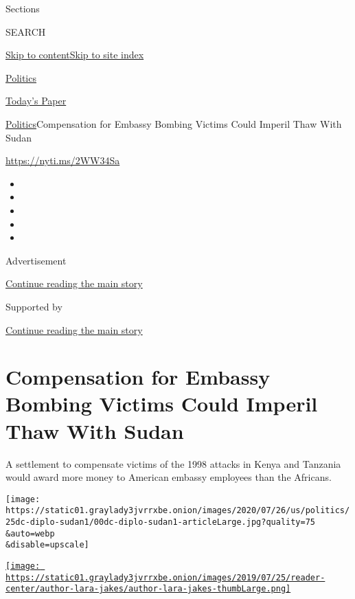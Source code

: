 Sections

SEARCH

\protect\hyperlink{site-content}{Skip to
content}\protect\hyperlink{site-index}{Skip to site index}

\href{https://www.nytimes3xbfgragh.onion/section/politics}{Politics}

\href{https://myaccount.nytimes3xbfgragh.onion/auth/login?response_type=cookie\&client_id=vi}{}

\href{https://www.nytimes3xbfgragh.onion/section/todayspaper}{Today's
Paper}

\href{/section/politics}{Politics}\textbar{}Compensation for Embassy
Bombing Victims Could Imperil Thaw With Sudan

\url{https://nyti.ms/2WW34Sa}

\begin{itemize}
\item
\item
\item
\item
\item
\end{itemize}

Advertisement

\protect\hyperlink{after-top}{Continue reading the main story}

Supported by

\protect\hyperlink{after-sponsor}{Continue reading the main story}

\hypertarget{compensation-for-embassy-bombing-victims-could-imperil-thaw-with-sudan}{%
\section{Compensation for Embassy Bombing Victims Could Imperil Thaw
With
Sudan}\label{compensation-for-embassy-bombing-victims-could-imperil-thaw-with-sudan}}

A settlement to compensate victims of the 1998 attacks in Kenya and
Tanzania would award more money to American embassy employees than the
Africans.

\texttt{[image: https://static01.graylady3jvrrxbe.onion/images/2020/07/26/us/politics/25dc-diplo-sudan1/00dc-diplo-sudan1-articleLarge.jpg?quality=75\\\&auto=webp\\\&disable=upscale]}

\href{https://www.nytimes3xbfgragh.onion/by/lara-jakes}{\texttt{[image: https://static01.graylady3jvrrxbe.onion/images/2019/07/25/reader-center/author-lara-jakes/author-lara-jakes-thumbLarge.png]}}

